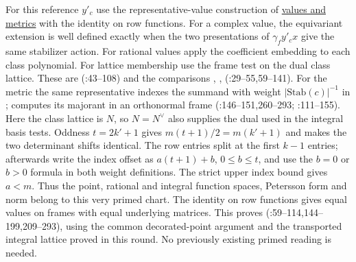For this reference $y'_c$ use the representative-value construction of
\hyperref[r13:s9-values]{values and metrics} with the identity on row functions.
For a complex value, the equivariant extension is well defined exactly when
the two presentations of $\gamma_f y'_c x$ give the same stabilizer action.
For rational values apply the coefficient embedding to each class
polynomial. For lattice membership use the frame test on the dual class lattice.
These are  (:43--108)
and the  comparisons , ,
 (:29--55,59--141).
For the metric the same representative indexes the summand with weight
$|\mathrm{Stab}(c)|^{-1}$ in ;
 computes its majorant in an orthonormal frame
(:146--151,260--293;
:111--155). Here the class
lattice is $N$, so $N=N^\vee$ also supplies the dual used in the
integral basis tests. Oddness $t=2k'+1$ gives
$m(t+1)/2=m(k'+1)$ and makes the two determinant shifts identical.
The row entries split at the first $k-1$ entries; afterwards write the
index offset as $a(t+1)+b$, $0\le b\le t$, and use the $b=0$ or
$b>0$ formula in both weight definitions. The strict upper index bound
gives $a<m$. Thus the point, rational and integral function spaces,
Petersson form and norm belong to this very primed chart. The identity
on row functions gives equal values on frames with equal underlying
matrices. This proves 
(:59--114,144--199,209--293), using the
common decorated-point argument and the transported integral lattice
proved in this round. No previously existing primed reading is needed.

